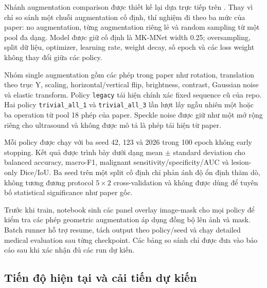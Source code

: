 \documentclass[12pt,a4paper]{article}
\begin{document}
Nhánh augmentation comparison được thiết kế lại dựa trực tiếp trên . Thay vì chỉ so sánh một chuỗi augmentation cố định, thí nghiệm đi theo ba mức của paper: no augmentation, từng augmentation riêng lẻ và random sampling từ một pool đa dạng. Model được giữ cố định là MK-MNet width 0.25; oversampling, split dữ liệu, optimizer, learning rate, weight decay, số epoch và các loss weight không thay đổi giữa các policy.

Nhóm single augmentation gồm các phép trong paper như rotation, translation theo trục Y, scaling, horizontal/vertical flip, brightness, contrast, Gaussian noise và elastic transform. Policy \texttt{legacy} tái hiện chính xác fixed sequence cũ của repo. Hai policy \texttt{trivial\_all\_1} và \texttt{trivial\_all\_3} lần lượt lấy ngẫu nhiên một hoặc ba operation từ pool 18 phép của paper. Speckle noise được giữ như một mở rộng riêng cho ultrasound và không được mô tả là phép tái hiện từ paper.

Mỗi policy được chạy với ba seed 42, 123 và 2026 trong 100 epoch không early stopping. Kết quả được trình bày dưới dạng mean \(\pm\) standard deviation cho balanced accuracy, macro-F1, malignant sensitivity/specificity/AUC và lesion-only Dice/IoU. Ba seed trên một split cố định chỉ phản ánh độ ổn định thăm dò, không tương đương protocol \(5\times2\) cross-validation và không được dùng để tuyên bố statistical significance như paper gốc.

Trước khi train, notebook sinh các panel overlay image-mask cho mọi policy để kiểm tra các phép geometric augmentation áp dụng đồng bộ lên ảnh và mask. Batch runner hỗ trợ resume, tách output theo policy/seed và chạy detailed medical evaluation sau từng checkpoint. Các bảng so sánh chỉ được đưa vào báo cáo sau khi  xác nhận đủ các run dự kiến.


\subsection{Tiến độ hiện tại và cải tiến dự kiến}
\end{document}
